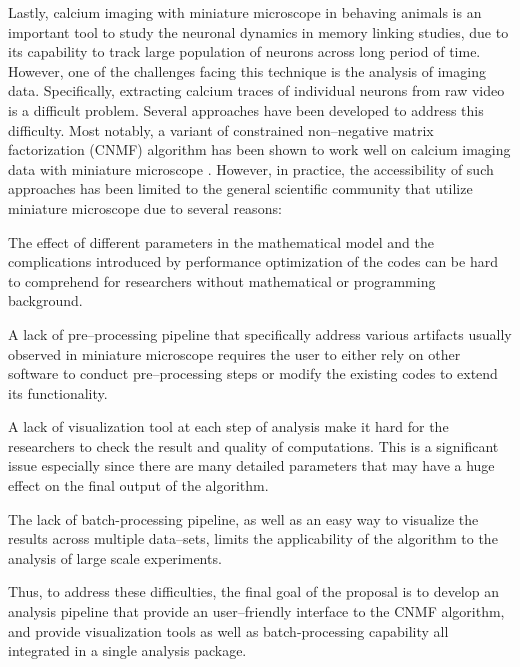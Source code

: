 \documentclass[master.tex]{subfiles}
\begin{document}
Lastly, calcium imaging with miniature microscope in behaving animals is an
important tool to study the neuronal dynamics in memory linking studies, due to
its capability to track large population of neurons across long period of time.
However, one of the challenges facing this technique is the analysis of imaging
data. Specifically, extracting calcium traces of individual neurons from raw
video is a difficult problem. Several approaches have been developed to address
this difficulty. Most notably, a variant of constrained non--negative matrix
factorization (CNMF) algorithm has been shown to work well on calcium imaging data with
miniature microscope \cite{pnevmatikakis_simultaneous_2016,
  zhou_efficient_2016}. However, in practice, the accessibility of such
approaches has been limited to the general scientific community that utilize
miniature microscope due to several reasons:
\begin{inparaenum}[a)]
\item The effect of different parameters in the mathematical model and the
  complications introduced by performance optimization of the codes can be hard
  to comprehend for researchers without mathematical or programming background.
\item A lack of pre--processing pipeline that specifically address various
  artifacts usually observed in miniature microscope requires the user to either
  rely on other software to conduct pre--processing steps or modify the existing
  codes to extend its functionality.
\item A lack of visualization tool at each step of analysis make it hard for the
  researchers to check the result and quality of computations. This is a
  significant issue especially since there are many detailed parameters that may
  have a huge effect on the final output of the algorithm.
\item The lack of batch-processing pipeline, as well as an easy way to visualize
  the results across multiple data--sets, limits the applicability of the
  algorithm to the analysis of large scale experiments.
\end{inparaenum}
Thus, to address these difficulties, the final goal of the proposal is to
develop an analysis pipeline that provide an user--friendly interface to the
CNMF algorithm, and provide visualization tools as well as batch-processing
capability all integrated in a single analysis package.
\end{document}
